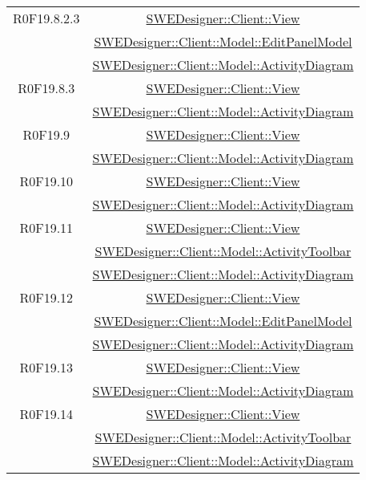 \documentclass[../SpecificaTecnica.tex]{subfiles}
\begin{document}
\begin{longtable}{|c|c|}
		R0F19.8.2.3 & \hyperlink{SWEDesigner::Client::View}{SWEDesigner::Client::View} \\& \hyperlink{SWEDesigner::Client::Model::EditPanelModel}{SWEDesigner::Client::Model::EditPanelModel} \\& \hyperlink{SWEDesigner::Client::Model::ActivityDiagram}{SWEDesigner::Client::Model::ActivityDiagram} \\\hline
		R0F19.8.3 & \hyperlink{SWEDesigner::Client::View}{SWEDesigner::Client::View} \\& \hyperlink{SWEDesigner::Client::Model::ActivityDiagram}{SWEDesigner::Client::Model::ActivityDiagram} \\\hline
		R0F19.9 & \hyperlink{SWEDesigner::Client::View}{SWEDesigner::Client::View} \\& \hyperlink{SWEDesigner::Client::Model::ActivityDiagram}{SWEDesigner::Client::Model::ActivityDiagram} \\\hline
		R0F19.10 & \hyperlink{SWEDesigner::Client::View}{SWEDesigner::Client::View} \\& \hyperlink{SWEDesigner::Client::Model::ActivityDiagram}{SWEDesigner::Client::Model::ActivityDiagram} \\\hline
		R0F19.11 & \hyperlink{SWEDesigner::Client::View}{SWEDesigner::Client::View} \\& \hyperlink{SWEDesigner::Client::Model::ActivityToolbar}{SWEDesigner::Client::Model::ActivityToolbar} \\& \hyperlink{SWEDesigner::Client::Model::ActivityDiagram}{SWEDesigner::Client::Model::ActivityDiagram} \\\hline
		R0F19.12 & \hyperlink{SWEDesigner::Client::View}{SWEDesigner::Client::View} \\& \hyperlink{SWEDesigner::Client::Model::EditPanelModel}{SWEDesigner::Client::Model::EditPanelModel} \\& \hyperlink{SWEDesigner::Client::Model::ActivityDiagram}{SWEDesigner::Client::Model::ActivityDiagram} \\\hline
		R0F19.13 & \hyperlink{SWEDesigner::Client::View}{SWEDesigner::Client::View} \\& \hyperlink{SWEDesigner::Client::Model::ActivityDiagram}{SWEDesigner::Client::Model::ActivityDiagram}\\\hline
		R0F19.14 & \hyperlink{SWEDesigner::Client::View}{SWEDesigner::Client::View} \\& \hyperlink{SWEDesigner::Client::Model::ActivityToolbar}{SWEDesigner::Client::Model::ActivityToolbar} \\& \hyperlink{SWEDesigner::Client::Model::ActivityDiagram}{SWEDesigner::Client::Model::ActivityDiagram} \\\hline

\end{longtable}
\end{document}
